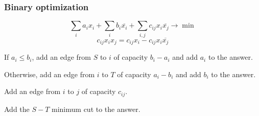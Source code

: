 \subsubsection{Binary optimization}
\[\sum_i a_i x_i + \sum_i b_i \overline{x_i} + \sum_{i, j} c_{i j} x_i \overline{x_j} \to \min\]
\[c_{i j} x_i x_j = c_{i j} x_i - c_{i j} x_i \overline{x_j}\]

If $a_i \le b_i$,
add an edge from $S$ to $i$ of capacity $b_i - a_i$
and add $a_i$ to the answer.

Otherwise,
add an edge from $i$ to $T$ of capacity $a_i - b_i$
and add $b_i$ to the answer.

Add an edge from $i$ to $j$ of capacity $c_{i j}$.

Add the $S-T$ minimum cut to the answer.
